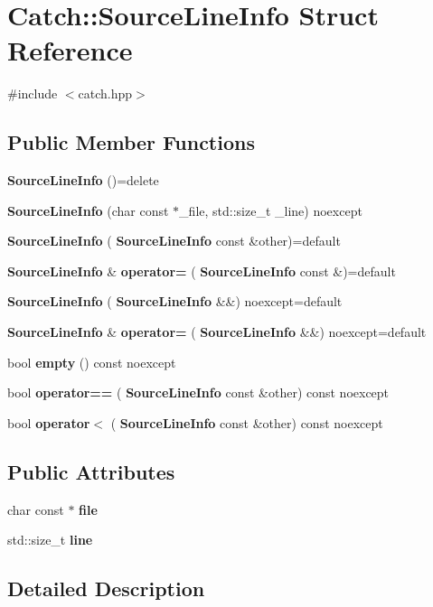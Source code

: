 \section{Catch\+::Source\+Line\+Info Struct Reference}
\label{struct_catch_1_1_source_line_info}


{\ttfamily \#include $<$catch.\+hpp$>$}

\subsection*{Public Member Functions}
\begin{DoxyCompactItemize}
\item 
\textbf{ Source\+Line\+Info} ()=delete
\item 
\textbf{ Source\+Line\+Info} (char const $\ast$\+\_\+file, std\+::size\+\_\+t \+\_\+line) noexcept
\item 
\textbf{ Source\+Line\+Info} (\textbf{ Source\+Line\+Info} const \&other)=default
\item 
\textbf{ Source\+Line\+Info} \& \textbf{ operator=} (\textbf{ Source\+Line\+Info} const \&)=default
\item 
\textbf{ Source\+Line\+Info} (\textbf{ Source\+Line\+Info} \&\&) noexcept=default
\item 
\textbf{ Source\+Line\+Info} \& \textbf{ operator=} (\textbf{ Source\+Line\+Info} \&\&) noexcept=default
\item 
bool \textbf{ empty} () const noexcept
\item 
bool \textbf{ operator==} (\textbf{ Source\+Line\+Info} const \&other) const noexcept
\item 
bool \textbf{ operator$<$} (\textbf{ Source\+Line\+Info} const \&other) const noexcept
\end{DoxyCompactItemize}
\subsection*{Public Attributes}
\begin{DoxyCompactItemize}
\item 
char const  $\ast$ \textbf{ file}
\item 
std\+::size\+\_\+t \textbf{ line}
\end{DoxyCompactItemize}


\subsection{Detailed Description}



